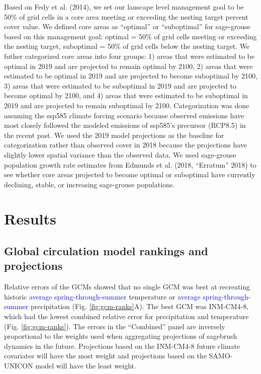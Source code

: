 \documentclass[
  12pt,
]{article}
\begin{document}
Based on Fedy et al. (2014), we set our lanscape level management goal to be 50\% of grid cells in a core area meeting or exceeding the nesting target percent cover value.
We defined core areas as ``optimal'' or ``suboptimal'' for sage-grouse based on this management goal: optimal = 50\% of grid cells meeting or exceeding the nesting target, suboptimal = 50\% of grid cells below the nesting target.
We futher categorized core areas into four groups: 1) areas that were estimated to be optimal in 2019 and are projected to remain optimal by 2100, 2) areas that were estimated to be optimal in 2019 and are projected to become suboptimal by 2100, 3) areas that were estimated to be suboptimal in 2019 and are projected to become optimal by 2100, and 4) areas that were estimated to be suboptimal in 2019 and are projected to remain suboptimal by 2100.
Categorization was done assuming the ssp585 climate forcing scenario because observed emissions have most closely followed the modeled emissions of ssp585's precursor (RCP8.5) in the recent past.
We used the 2019 model projections as the baseline for categorization rather than observed cover in 2018 because the projections have slightly lower spatial variance than the observed data.
We used sage-grouse population growth rate estimates from Edmunds et al. (2018, {``Erratum''} 2018) to see whether core areas projected to become optimal or suboptimal have currently declining, stable, or increasing sage-grouse populations.

\hypertarget{results}{%
\section{Results}\label{results}}

\hypertarget{global-circulation-model-rankings-and-projections}{%
\subsection{Global circulation model rankings and projections}\label{global-circulation-model-rankings-and-projections}}

Relative errors of the GCMs showed that no single GCM was best at recreating historic \textcolor{blue}{average spring-through-summer} temperature or \textcolor{blue}{average spring-through-summer} precipitation (Fig. \ref{fig:gcm-ranks}A).
The best GCM was INM-CM4-8, which had the lowest combined relative error for precipitation and temperature (Fig. \ref{fig:gcm-ranks}).
The errors in the ``Combined'' panel are inversely proportional to the weights used when aggregating projections of sagebrush dynamics in the future.
Projections based on the INM-CM4-8 future climate covariates will have the most weight and projections based on the SAMO-UNICON model will have the least weight.
\end{document}
